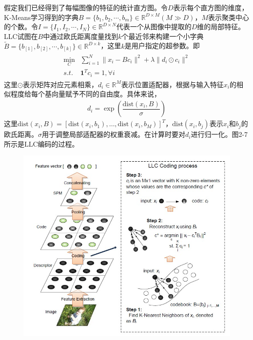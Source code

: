 \documentclass[supercite]{HustGraduPaper}
\begin{document}
\begin{sloppypar}
  假定我们已经得到了每幅图像的特征的统计直方图。令$D$表示每个直方图的维度，K-Means学习得到的字典$B=\{ b_1,b_2,\cdots,b_m \}\in\mathbb{R}^{D\times M}(M\gg D)$，$M$表示聚类中心的个数。令$I=\{ I_1,I_2,\cdots,I_N \}\in\mathbb{R}^{D\times N}$代表一个从图像中提取的$D$维的局部特征。LLC试图在$B$中通过欧氏距离度量找到$k$个最近邻来构建一个小字典$\tilde{B}=\{ b_{[1]},b_{[2]},\cdots,b_{[k]} \}\in\mathbb{R}^{D\times k}$，这里$k$是用户指定的超参数。即\begin{gather}
  \begin{array}{ll}
  \min\limits_C&\sum\limits^N_{i=1}\lVert x_i-Bc_i\rVert^2+\lambda\lVert d_i\odot c_i\rVert^2\\
  s.t.&\mathbf{1}^Tc_i=1,\forall i
  \end{array}
  \end{gather}
  这里$\odot$表示矩阵对应元素相乘，$d_i\in\mathbb{R}^M$表示位置适配器，根据与输入特征$x_i$的相似程度给每个基向量赋予不同的自由度。具体来说，\begin{gather}
     d_i=\exp\left( \dfrac{\text{dist}(x_i,B)}{\sigma} \right)
  \end{gather}
  这里$\text{dist}(x_i,B)=[\text{dist}(x_i,b_1),\dots,\text{dist}(x_i,b_M)]^T$，$\text{dist}(x_i,b_j)$表示$x_i$和$b_j$的欧氏距离。$\sigma$用于调整局部适配器的权重衰减。在计算时要对$d_i$进行归一化。图2-7所示是LLC编码的过程。
  \begin{figure}[H]
    \setlength{\abovecaptionskip}{0.2cm}
    \setlength{\belowcaptionskip}{-0.cm}
      \centering%
      \includegraphics[scale=0.8]{11.jpg}

\end{figure}
\end{sloppypar}
\end{document}
